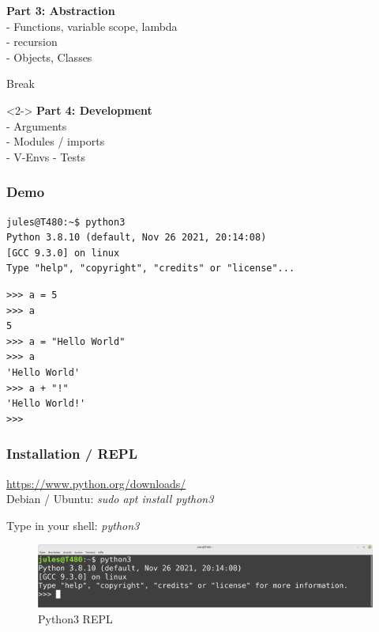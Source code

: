 \documentclass{beamer}
\begin{document}
\begin{frame}
	\begin{block}{}
		\textbf{Part 3: Abstraction}\\
		- Functions, variable scope, lambda\\
		- recursion\\
		- Objects, Classes\\
	\end{block}
	\begin{exampleblock}{}
	Break
	\end{exampleblock}
	\begin{block}{}<2->
		\textbf{Part 4: Development}\\
		- Arguments\\
		- Modules / imports\\
		- V-Envs
		- Tests
	\end{block}
\end{frame}

\begin{frame}[fragile]
	\frametitle{Demo}
	\begin{verbatim}
jules@T480:~$ python3
Python 3.8.10 (default, Nov 26 2021, 20:14:08) 
[GCC 9.3.0] on linux
Type "help", "copyright", "credits" or "license"...
	\end{verbatim}
\begin{verbatim}
>>> a = 5
>>> a
5
>>> a = "Hello World"
>>> a
'Hello World'
>>> a + "!"
'Hello World!'
>>> 
	\end{verbatim}
\end{frame}

\begin{frame}
	\frametitle{Installation / REPL}
	\begin{center}
		\url{https://www.python.org/downloads/}\\
		Debian / Ubuntu: \textit{sudo apt install python3}\\
	\end{center}
	\begin{center}
		Type in your shell: \textit{python3}
	\end{center}
\end{frame}

\begin{frame}
	\begin{figure}
		\includegraphics[width=12cm]{figures/console.png}
		\caption{Python3 REPL}
	\end{figure}
\end{frame}
\end{document}

